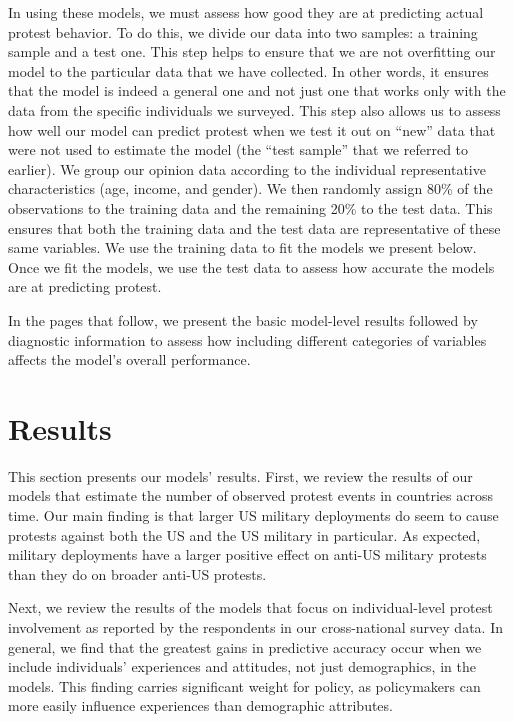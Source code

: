 			
			
			In using these models, we must assess how good they are at predicting actual protest behavior. To do this, we divide our data into two samples: a training sample and a test one. This step helps to ensure that we are not overfitting our model to the particular data that we have collected. In other words, it ensures that the model is indeed a general one and not just one that works only with the data from the specific individuals we surveyed. This step also allows us to assess how well our model can predict protest when we test it out on ``new'' data that were not used to estimate the model (the ``test sample'' that we referred to earlier). We group our opinion data according to the individual representative characteristics (age, income, and gender). We then randomly assign 80\% of the observations to the training data and the remaining 20\% to the test data. This ensures that both the training data and the test data are representative of these same variables. We use the training data to fit the models we present below. Once we fit the models, we use the test data to assess how accurate the models are at predicting protest.
			
			In the pages that follow, we present the basic model-level results followed by diagnostic information to assess how including different categories of variables affects the model's overall performance. 
			
			\section*{Results}
			
			This section presents our models' results. First, we review the results of our models that estimate the number of observed protest events in countries across time. Our main finding is that larger US military deployments do seem to cause protests against both the US and the US military in particular. As expected, military deployments have a larger positive effect on anti-US military protests than they do on broader anti-US protests.
			
			Next, we review the results of the models that focus on individual-level protest involvement as reported by the respondents in our cross-national survey data. In general, we find that the greatest gains in predictive accuracy occur when we include individuals' experiences and attitudes, not just demographics, in the models. This finding carries significant weight for policy, as policymakers can more easily influence experiences than demographic attributes. 
			
